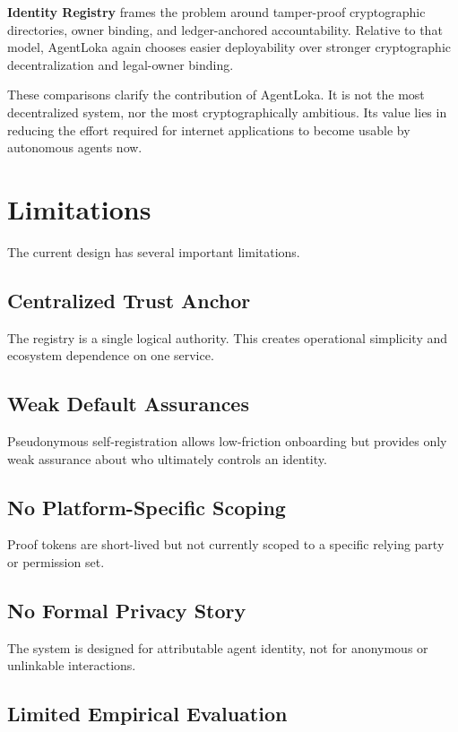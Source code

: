 \documentclass[11pt]{article}
\begin{document}
\textbf{Identity Registry} frames the problem around tamper-proof cryptographic directories, owner binding, and ledger-anchored accountability. Relative to that model, AgentLoka again chooses easier deployability over stronger cryptographic decentralization and legal-owner binding.

These comparisons clarify the contribution of AgentLoka. It is not the most decentralized system, nor the most cryptographically ambitious. Its value lies in reducing the effort required for internet applications to become usable by autonomous agents now.

\section{Limitations}

The current design has several important limitations.

\subsection{Centralized Trust Anchor}

The registry is a single logical authority. This creates operational simplicity and ecosystem dependence on one service.

\subsection{Weak Default Assurances}

Pseudonymous self-registration allows low-friction onboarding but provides only weak assurance about who ultimately controls an identity.

\subsection{No Platform-Specific Scoping}

Proof tokens are short-lived but not currently scoped to a specific relying party or permission set.

\subsection{No Formal Privacy Story}

The system is designed for attributable agent identity, not for anonymous or unlinkable interactions.

\subsection{Limited Empirical Evaluation}
\end{document}
